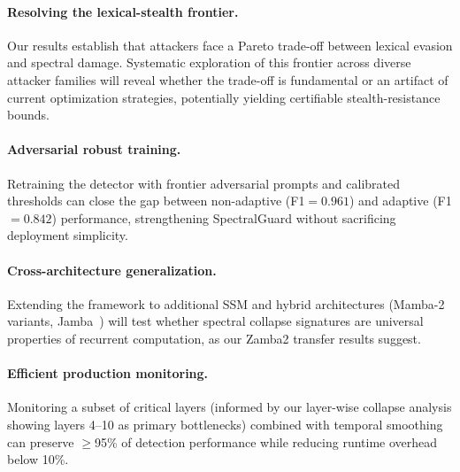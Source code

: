 \documentclass[10pt,twocolumn]{article}
\begin{document}
\paragraph{Resolving the lexical-stealth frontier.}
Our results establish that attackers face a Pareto trade-off between lexical evasion and spectral damage. Systematic exploration of this frontier across diverse attacker families will reveal whether the trade-off is fundamental or an artifact of current optimization strategies, potentially yielding certifiable stealth-resistance bounds.

\paragraph{Adversarial robust training.}
Retraining the detector with frontier adversarial prompts and calibrated thresholds can close the gap between non-adaptive (F1$=0.961$) and adaptive (F1$=0.842$) performance, strengthening SpectralGuard without sacrificing deployment simplicity.

\paragraph{Cross-architecture generalization.}
Extending the framework to additional SSM and hybrid architectures (Mamba-2 variants, Jamba~\cite{lieber2024jamba}) will test whether spectral collapse signatures are universal properties of recurrent computation, as our Zamba2 transfer results suggest.

\paragraph{Efficient production monitoring.}
Monitoring a subset of critical layers (informed by our layer-wise collapse analysis showing layers 4--10 as primary bottlenecks) combined with temporal smoothing can preserve $\ge$95\% of detection performance while reducing runtime overhead below 10\%.

\end{document}
